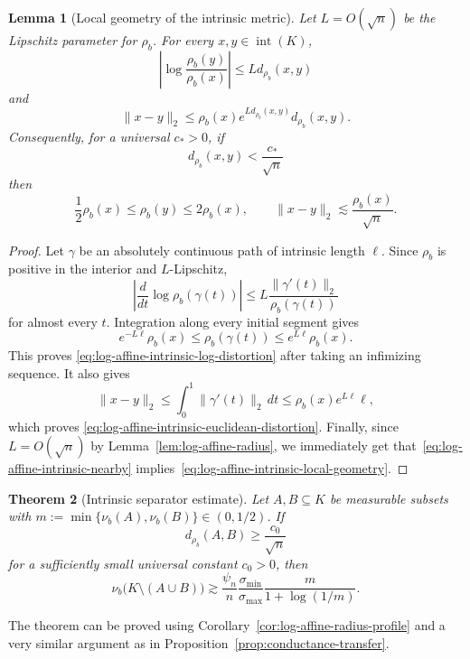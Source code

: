 \documentclass[11pt]{article}
\newtheorem{theorem}{Theorem}[section]
\newtheorem{lemma}[theorem]{Lemma}
\theoremstyle{definition}
\theoremstyle{remark}
\begin{document}
\begin{lemma}[Local geometry of the intrinsic metric]
\label{lem:log-affine-intrinsic-local-geometry}
Let $L=O(\sqrt{n})$ be the Lipschitz parameter for $\rho_b$.  For every $x,y\in\operatorname{int}(K)$,
\begin{equation}\label{eq:log-affine-intrinsic-log-distortion}
 \left|\log\frac{\rho_b(y)}{\rho_b(x)}\right|
 \le L d_{\rho_b}(x,y)
\end{equation}
and
\begin{equation}\label{eq:log-affine-intrinsic-euclidean-distortion}
 \|x-y\|_2
 \le
 \rho_b(x)e^{L d_{\rho_b}(x,y)}d_{\rho_b}(x,y).
\end{equation}
Consequently, for a universal $c_*>0$, if
\begin{equation}\label{eq:log-affine-intrinsic-nearby}
 d_{\rho_b}(x,y)<\frac{c_*}{\sqrt n}
\end{equation}
then
\begin{equation}\label{eq:log-affine-intrinsic-local-geometry}
 \frac12\rho_b(x)\le\rho_b(y)\le2\rho_b(x),
 \qquad
 \|x-y\|_2\lesssim \frac{\rho_b(x)}{\sqrt n}.
\end{equation}
\end{lemma}

\begin{proof}
Let $\gamma$ be an absolutely continuous path of intrinsic length $\ell$.  Since $\rho_b$ is positive in the interior and $L$-Lipschitz,
\[
 \left|\frac{d}{dt}\log\rho_b(\gamma(t))\right|
 \le L\frac{\|\gamma'(t)\|_2}{\rho_b(\gamma(t))}
\]
for almost every $t$.  Integration along every initial segment gives
\[
 e^{-L\ell}\rho_b(x)
 \le\rho_b(\gamma(t))
 \le e^{L\ell}\rho_b(x).
\]
This proves \eqref{eq:log-affine-intrinsic-log-distortion} after taking an infimizing sequence.  It also gives
\[
 \|x-y\|_2
 \le\int_0^1\|\gamma'(t)\|_2\,dt
 \le\rho_b(x)e^{L\ell}\ell,
\]
which proves \eqref{eq:log-affine-intrinsic-euclidean-distortion}.  Finally, since $L=O(\sqrt{n})$ by  Lemma~\ref{lem:log-affine-radius}, we immediately get that~\eqref{eq:log-affine-intrinsic-nearby} implies~\eqref{eq:log-affine-intrinsic-local-geometry}.
\end{proof}


\begin{theorem}[Intrinsic separator estimate]
\label{thm:log-affine-separator}
Let $A,B\subseteq K$ be measurable subsets with $m:=\min\{\nu_b(A),\nu_b(B)\}\in (0,1/2)$. If
\begin{equation}\label{eq:log-affine-set-separation}
 d_{\rho_b}(A,B)
 \ge
 \frac{c_0}{\sqrt n}
\end{equation}
for a sufficiently small universal constant $c_0>0$, then
\begin{equation}\label{eq:log-affine-separator}
 \nu_b\bigl(K\setminus(A\cup B)\bigr)
 \gtrsim
 \frac{\psi_n}{n}
 \frac{\sigma_{\min}}{\sigma_{\max}}
 \frac{m}{1+\log(1/m)}.
\end{equation}
\end{theorem}
The theorem can be proved using Corollary~\ref{cor:log-affine-radius-profile} and a very similar argument as in Proposition~\ref{prop:conductance-transfer}. 
\end{document}
